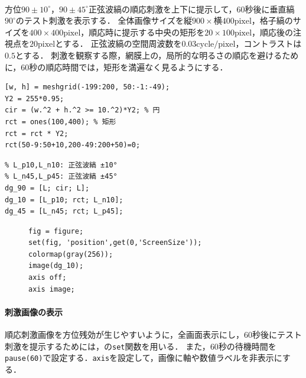 \paragraph{\kadaicb}
方位\(90\pm 10^\circ\)，\(90\pm 45^\circ\)正弦波縞の順応刺激を上下に提示して，\(60\)秒後に垂直縞\(90^\circ\)のテスト刺激を表示する．
全体画像サイズを\(\textrm{縦}900\times\textrm{横}400\textrm{pixel}\)，格子縞のサイズを\(400\times 400\textrm{pixel}\)，順応時に提示する中央の矩形を\(20\times 100\textrm{pixel}\)，順応後の注視点を\(20\textrm{pixel}\)とする．
正弦波縞の空間周波数を\(0.03\textrm{cycle}/\textrm{pixel}\)，コントラストは\(0.5\)とする．
刺激を観察する際，網膜上の，局所的な明るさの順応を避けるために，\(60\)秒の順応時間では，矩形を満遍なく見るようにする．
\begin{center}
    \begin{minipage}[t]{.48\textwidth}
        \begin{lstlisting}[caption={矩形と円の作成},label={src:矩形と円の作成}]
[w, h] = meshgrid(-199:200, 50:-1:-49);
Y2 = 255*0.95;
cir = (w.^2 + h.^2 >= 10.^2)*Y2; % 円
rct = ones(100,400); % 矩形
rct = rct * Y2;
rct(50-9:50+10,200-49:200+50)=0;
        \end{lstlisting}
    \end{minipage}
    \hspace{.5em}
    \begin{minipage}[t]{.48\textwidth}
        \begin{lstlisting}[caption={順応刺激画像の作成},label={src:順応刺激画像の作成}]
% L: 正弦波縞 90°
% L_p10,L_n10: 正弦波縞 ±10° 
% L_n45,L_p45: 正弦波縞 ±45°
dg_90 = [L; cir; L];
dg_10 = [L_p10; rct; L_n10];
dg_45 = [L_n45; rct; L_p45];
        \end{lstlisting}
    \end{minipage}
    \vspace{-.5em}
\end{center}
\newpage
\begin{figure}
    \vspace{-1cm}
    \begin{lstlisting}[caption={刺激画像の表示方法},label={src:刺激画像の表示方法}]
fig = figure;
set(fig, 'position',get(0,'ScreenSize'));
colormap(gray(256));
image(dg_10);
axis off;
axis image;    
    \end{lstlisting}
    \vspace{-.5cm}
\end{figure}
\paragraph{刺激画像の表示}
順応刺激画像を方位残効が生じやすいように，全画面表示にし，\(60\)秒後にテスト刺激を提示するためには，\matlab の\texttt{set}関数を用いる．
また，\(60\)秒の待機時間を\texttt{pause(60)}で設定する．\texttt{axis}を設定して，画像に軸や数値ラベルを非表示にする．
